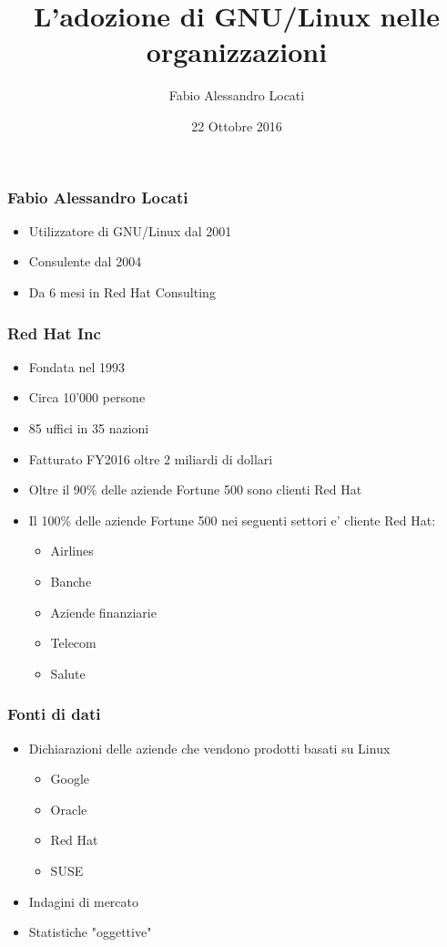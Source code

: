 \documentclass[t,aspectratio=169]{beamer}
\title{L'adozione di GNU/Linux nelle organizzazioni}
\author{Fabio Alessandro Locati}
\date{22 Ottobre 2016}
\institute{Senior Cloud Consultant}
\begin{document}
\maketitle

\begin{frame}
    \frametitle{Fabio Alessandro Locati}
    \begin{itemize}
        \item<2-> Utilizzatore di GNU/Linux dal 2001
        \item<3-> Consulente dal 2004
        \item<4-> Da 6 mesi in Red Hat Consulting
    \end{itemize}
\end{frame}

\begin{frame}
    \frametitle{Red Hat Inc}
    \begin{itemize}
        \item<2-> Fondata nel 1993
        \item<3-> Circa 10'000 persone
        \item<4-> 85 uffici in 35 nazioni
        \item<5-> Fatturato FY2016 oltre 2 miliardi di dollari
        \item<6-> Oltre il 90\% delle aziende Fortune 500 sono clienti Red Hat
        \item<7-> Il 100\% delle aziende Fortune 500 nei seguenti settori e' cliente Red Hat:
        \begin{itemize}
            \item<7-> Airlines
            \item<7-> Banche
            \item<7-> Aziende finanziarie
            \item<7-> Telecom
            \item<7-> Salute
        \end{itemize}
    \end{itemize}
\end{frame}

\begin{frame}
    \frametitle{Fonti di dati}
    \begin{itemize}
        \item<2-> Dichiarazioni delle aziende che vendono prodotti basati su Linux
        \begin{itemize}
            \item<2-> Google 
            \item<2-> Oracle
            \item<2-> Red Hat
            \item<2-> SUSE
        \end{itemize}
        \item<4-> Indagini di mercato
        \item<5-> Statistiche "oggettive"
    \end{itemize}
\end{frame}
\end{document}
